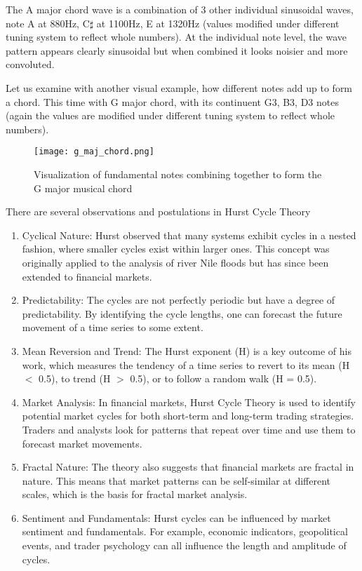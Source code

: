 \documentclass{article}
\begin{document}
\noindent The A major chord wave is a combination of 3 other individual sinusoidal waves, note A at 880Hz, C\(\sharp\) at 1100Hz, E at 1320Hz (values modified under different tuning system to reflect whole numbers). At the individual note level, the wave pattern appears clearly sinusoidal but when combined it looks noisier and more convoluted.

\noindent Let us examine with another visual example, how different notes add up to form a chord. This time with G major chord, with its continuent G3, B3, D3 notes (again the values are modified under different tuning system to reflect whole numbers).

\begin{figure}[h]
    \centering
    \texttt{[image: g\_maj\_chord.png]}
    \caption{Visualization of fundamental notes combining together to form the G major musical chord}
    \label{fig:gmajchord}
\end{figure}


\noindent There are several observations and postulations in Hurst Cycle Theory
\begin{enumerate}
\item Cyclical Nature: Hurst observed that many systems exhibit cycles in a nested fashion, where smaller cycles exist within larger ones. This concept was originally applied to the analysis of river Nile floods but has since been extended to financial markets.
\item Predictability: The cycles are not perfectly periodic but have a degree of predictability. By identifying the cycle lengths, one can forecast the future movement of a time series to some extent.
\item Mean Reversion and Trend: The Hurst exponent (H) is a key outcome of his work, which measures the tendency of a time series to revert to its mean (H \(<\) 0.5), to trend (H \(>\) 0.5), or to follow a random walk (H = 0.5).
\item Market Analysis: In financial markets, Hurst Cycle Theory is used to identify potential market cycles for both short-term and long-term trading strategies. Traders and analysts look for patterns that repeat over time and use them to forecast market movements.
\item Fractal Nature: The theory also suggests that financial markets are fractal in nature. This means that market patterns can be self-similar at different scales, which is the basis for fractal market analysis.
\item Sentiment and Fundamentals: Hurst cycles can be influenced by market sentiment and fundamentals. For example, economic indicators, geopolitical events, and trader psychology can all influence the length and amplitude of cycles.
\end{enumerate}
\end{document}
